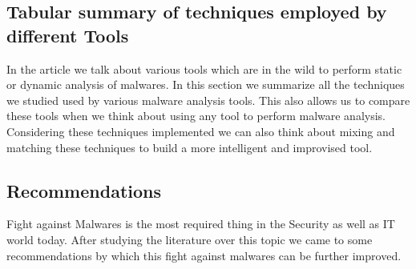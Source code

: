 \documentclass[11pt]{article}
\begin{document}
	\subsection{Tabular summary of techniques employed by different Tools}
	In the article we talk about various tools which are in the wild to perform static or dynamic analysis of malwares. In this section we summarize all the techniques we studied used by various malware analysis tools. This also allows us to compare these tools when we think about using any tool to perform malware analysis. Considering these techniques implemented we can also think about mixing and matching these techniques to build a more intelligent and improvised tool.
	

	
	\subsection{Recommendations}
	Fight against Malwares is the most required thing in the Security as well as IT world today. After studying the literature over this topic we came to some recommendations by which this fight against malwares can be further improved.
\end{document}
